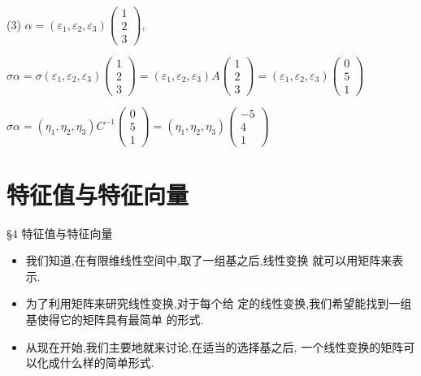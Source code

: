 \documentclass[13pt]{beamer}
\begin{document}
\begin{frame}
	
(3) $\alpha=\left(\varepsilon_{1}, \varepsilon_{2}, \varepsilon_{3}\right)\left(\begin{array}{l}1 \\ 2 \\ 3\end{array}\right)$, 

$\sigma \alpha=\sigma\left(\varepsilon_{1}, \varepsilon_{2}, \varepsilon_{3}\right)\left(\begin{array}{l}1 \\ 2 \\ 3\end{array}\right)=\left(\varepsilon_{1}, \varepsilon_{2}, \varepsilon_{3}\right) A\left(\begin{array}{l}1 \\ 2 \\ 3\end{array}\right)
=\left(\varepsilon_{1}, \varepsilon_{2}, \varepsilon_{3}\right) \left(\begin{array}{l}0 \\ 5 \\ 1\end{array}\right)
$

$
\sigma \alpha
=\left(\eta_{1}, \eta_{2}, \eta_{3}\right) C^{-1} 
	\left(\begin{array}{l}0 \\ 5 \\ 1	\end{array}\right)
= \left(\eta_{1}, \eta_{2}, \eta_{3}\right)
	\left(\begin{array}{c} -5 \\ 4 \\ 1	\end{array}\right)
$
\end{frame}

\section{特征值与特征向量}
\begin{frame}{\S 4 特征值与特征向量}
\begin{itemize}
\item 我们知道,在有限维线性空间中,取了一组基之后,线性变换 就可以用矩阵来表示.

\item 为了利用矩阵来研究线性变换,对于每个给 定的线性变换,我们希望能找到一组基使得它的矩阵具有最简单 的形式.

\item 从现在开始,我们主要地就来讨论,在适当的选择基之后,  一个线性变换的矩阵可以化成什么样的简单形式.
\end{itemize}
\end{frame}
\end{document}
